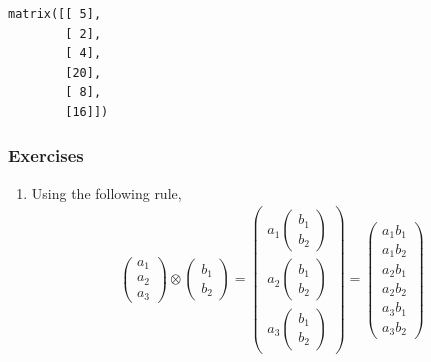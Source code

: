 \documentclass[11pt]{article}
\providecommand{\tightlist}{%
      \setlength{\itemsep}{0pt}\setlength{\parskip}{0pt}}
\newcommand{\prompt}[4]{
        \llap{{\color{#2}[#3]: #4}}\vspace{-1.25em}
    }
\begin{document}
            \begin{tcolorbox}[breakable, boxrule=.5pt, size=fbox, pad at break*=1mm, opacityfill=0]
\prompt{Out}{outcolor}{33}{\hspace{3.5pt}}
\begin{Verbatim}[commandchars=\\\{\}]
matrix([[ 5],
        [ 2],
        [ 4],
        [20],
        [ 8],
        [16]])
\end{Verbatim}
\end{tcolorbox}
        
    \hypertarget{exercises}{%
\subsubsection{Exercises}\label{exercises}}

    \begin{enumerate}
\def\labelenumi{\arabic{enumi}.}
\tightlist
\item
  Using the following rule, \begin{align}
  \begin{pmatrix}
  a_1 \\ a_2 \\ a_3
  \end{pmatrix} \otimes
  \begin{pmatrix}
  b_1 \\ b_2
  \end{pmatrix} = 
  \begin{pmatrix}
  a_1 \begin{pmatrix}
  b_1 \\ b_2
  \end{pmatrix} \\ a_2\begin{pmatrix}
  b_1 \\ b_2
  \end{pmatrix} \\ a_3\begin{pmatrix}
  b_1 \\ b_2
  \end{pmatrix}
  \end{pmatrix} = 
  \begin{pmatrix}
  a_1b_1 \\ a_1b_2 \\ a_2b_1 \\ a_2b_2 \\ a_3b_1 \\ a_3b_2
  \end{pmatrix}
  \end{align}
\end{enumerate}
\end{document}
